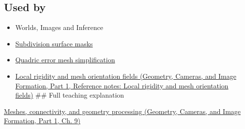 \subsection{Used by}\label{appendix-1aea26b2307f-used-by}

\hypertarget{appendix-1aea26b2307f-used-by}{}

\begin{itemize}
\item
  {Worlds, Images and Inference}
\item
  \hyperref[appendix-0234ab7f86b1]{Subdivision surface masks}
\item
  \hyperref[appendix-1dd4ad54ca57]{Quadric error mesh simplification}
\item
  \href{../03-Geometry-Cameras-and-Image-Formation-P01/main.pdf\#appendix-7107009c505b}{Local rigidity and mesh orientation fields (Geometry, Cameras, and Image Formation, Part 1, Reference notes: Local rigidity and mesh orientation fields)} \#\# Full teaching explanation
\end{itemize}

\href{../03-Geometry-Cameras-and-Image-Formation-P01/main.pdf\#03-visual-computing-i-ch002-meshes-connectivity-and-geometry-processing}{Meshes, connectivity, and geometry processing (Geometry, Cameras, and Image Formation, Part 1, Ch. 9)}
